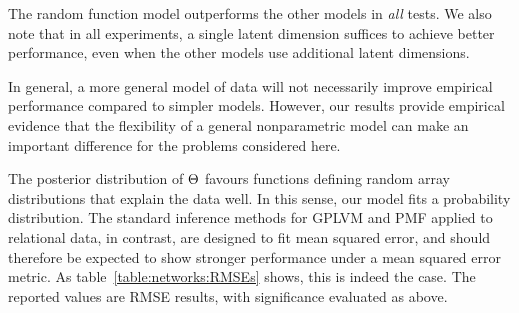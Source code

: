 The random function model outperforms the other models in \emph{all} tests.
We also note that in all experiments, a single latent dimension suffices to achieve better performance, even when the other models use additional latent dimensions.

In general, a more general model of data will not necessarily improve empirical performance compared to simpler models.
However, our results provide empirical evidence that the flexibility of a general nonparametric model can make an important difference for the problems considered here.

The posterior distribution of $\Theta$ favours functions defining random array distributions that explain the data well.
In this sense, our model fits a probability distribution.
The standard inference methods for GPLVM and PMF applied to relational data, in contrast, are designed to fit mean squared error, and should therefore be expected to show stronger performance under a mean squared error metric.
As table~\ref{table:networks:RMSEs} shows, this is indeed the case.
The reported values are RMSE results, with significance evaluated as above.

